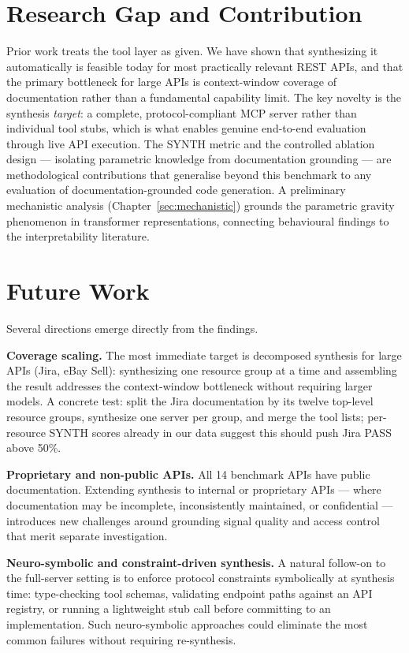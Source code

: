 \section*{Research Gap and Contribution}

Prior work treats the tool layer as given. We have shown that synthesizing it automatically is feasible today for most practically relevant REST APIs, and that the primary bottleneck for large APIs is context-window coverage of documentation rather than a fundamental capability limit. The key novelty is the synthesis \emph{target}: a complete, protocol-compliant MCP server rather than individual tool stubs, which is what enables genuine end-to-end evaluation through live API execution. The SYNTH metric and the controlled ablation design --- isolating parametric knowledge from documentation grounding --- are methodological contributions that generalise beyond this benchmark to any evaluation of documentation-grounded
code generation. A preliminary mechanistic analysis (Chapter~\ref{sec:mechanistic}) grounds the parametric gravity phenomenon in transformer representations, connecting behavioural findings to the interpretability literature.

\section*{Future Work}

Several directions emerge directly from the findings.

\textbf{Coverage scaling.} The most immediate target is decomposed synthesis for large APIs (Jira, eBay Sell): synthesizing one resource group at a time and assembling the result addresses the context-window bottleneck without requiring larger models. A concrete test: split the Jira documentation by its twelve top-level resource groups, synthesize one server per group, and merge the tool lists; per-resource SYNTH scores already in our data suggest this should push Jira PASS above 50\%.

\textbf{Proprietary and non-public APIs.} All 14 benchmark APIs have public documentation. Extending synthesis to internal or proprietary APIs --- where documentation may be incomplete, inconsistently maintained, or confidential --- introduces new challenges around grounding signal quality and access control that merit separate investigation.

\textbf{Neuro-symbolic and constraint-driven synthesis.} A natural follow-on to the full-server setting is to enforce protocol constraints symbolically at synthesis time: type-checking tool schemas, validating endpoint paths against an API registry, or running a lightweight stub call before committing to an implementation. Such neuro-symbolic approaches could eliminate the most common  failures without requiring re-synthesis.

